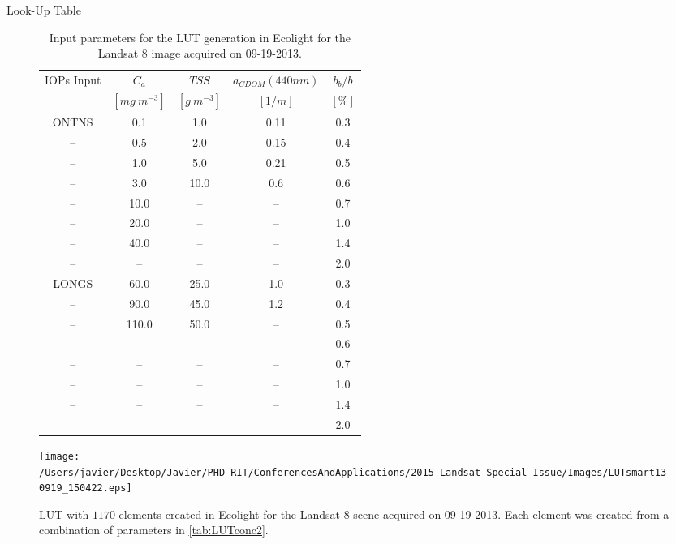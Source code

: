 \documentclass{beamer}
\begin{document}
\begin{frame}{}
\begin{columns}[t]
\begin{column}{.3\linewidth}
\begin{block}{Look-Up Table}
\begin{figure}[htb]
  \begin{minipage}[c]{0.44\linewidth}
\begin{table}[htb]
\caption{Input parameters for the LUT generation in Ecolight for the Landsat 8 image acquired on 09-19-2013. \label{tab:LUTconc2}} 
\scriptsize
\centering
    \begin{tabular}{c|c|c|c|c}
    \hline \hline
            IOPs Input & \bfseries{$C_a$} & \bfseries{$TSS$} & \bfseries{$a_{CDOM}(440nm)$} & \bfseries{$b_b/b$}    \\
                   & $[mg~m^{-3}]$        & $[g~m^{-3}]$       &  $[1/m]$           & $[\%]$            \\ \hline \hline
ONTNS   &  0.1    & 1.0     &  0.11   &  0.3  \\
--    &  0.5    & 2.0     &  0.15   &  0.4  \\
--      &  1.0    & 5.0     &  0.21   &  0.5  \\
--      &  3.0    & 10.0    &  0.6    &  0.6  \\ 
--    &  10.0     & --    &  --   &  0.7  \\  
--      &  20.0     & --    &  --   &  1.0  \\  
--      &  40.0     & --    &  --   &  1.4  \\
--      &  --       & --    &  --   &  2.0  \\ \hline

LONGS   &  60.0   & 25.0    &  1.0    &  0.3  \\
--      &  90.0   & 45.0    &  1.2    &  0.4  \\
--      &  110.0  & 50.0    &  --     &  0.5  \\
--      &  --     & --      &  --     &  0.6  \\  
--      &  --     & --      &  --     &  0.7  \\  
--      &  --     & --      &  --     &  1.0  \\   
--      &  --     & --      &  --     &  1.4  \\  
--      &  --     & --      &  --     &  2.0  \\  \hline \hline
    \end{tabular}
  \end{table}
  \end{minipage}
  \hfill
  \begin{minipage}[d]{0.54\linewidth}  
    \centering
      \texttt{[image: /Users/javier/Desktop/Javier/PHD\_RIT/ConferencesAndApplications/2015\_Landsat\_Special\_Issue/Images/LUTsmart130919\_150422.eps]}
      \caption{LUT with $1170$ elements created in Ecolight for the Landsat 8 scene acquired on 09-19-2013. Each element was created from a combination of parameters in \autoref{tab:LUTconc2}.}
      \label{fig:LUT}
  \end{minipage}
\end{figure}



\end{block}
\end{column}
\end{columns}
\end{frame}
\end{document}
